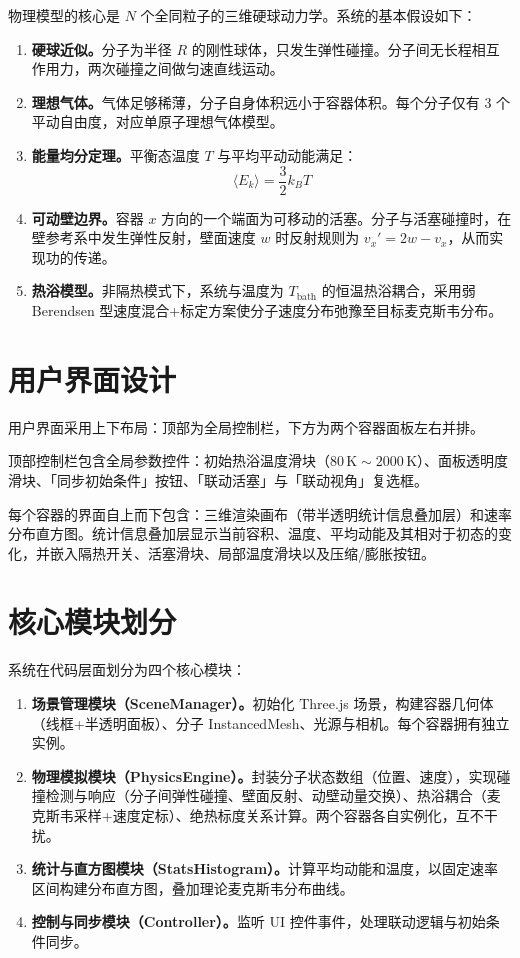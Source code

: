 \documentclass[zihao=-4,a4paper,oneside]{ctexbook}
\newcommand{\avg}[1]{\langle #1 \rangle}
\newcommand{\kb}{k_{\!B}}
\begin{document}
物理模型的核心是 $N$ 个全同粒子的三维硬球动力学。系统的基本假设如下：

\begin{enumerate}
  \item \textbf{硬球近似。}分子为半径 $R$ 的刚性球体，只发生弹性碰撞。分子间无长程相互作用力，两次碰撞之间做匀速直线运动。
  \item \textbf{理想气体。}气体足够稀薄，分子自身体积远小于容器体积。每个分子仅有 3 个平动自由度，对应单原子理想气体模型。
  \item \textbf{能量均分定理。}平衡态温度 $T$ 与平均平动动能满足：
  \begin{equation}
    \avg{E_k} = \frac{3}{2}\kb T
  \end{equation}
  \item \textbf{可动壁边界。}容器 $x$ 方向的一个端面为可移动的活塞。分子与活塞碰撞时，在壁参考系中发生弹性反射，壁面速度 $w$ 时反射规则为 $v_x'=2w-v_x$，从而实现功的传递。
  \item \textbf{热浴模型。}非隔热模式下，系统与温度为 $T_{\text{bath}}$ 的恒温热浴耦合，采用弱 Berendsen 型速度混合+标定方案使分子速度分布弛豫至目标麦克斯韦分布。
\end{enumerate}

\section{用户界面设计}

用户界面采用上下布局：顶部为全局控制栏，下方为两个容器面板左右并排。

顶部控制栏包含全局参数控件：初始热浴温度滑块（$80\,\text{K}\sim 2000\,\text{K}$）、面板透明度滑块、「同步初始条件」按钮、「联动活塞」与「联动视角」复选框。

每个容器的界面自上而下包含：三维渲染画布（带半透明统计信息叠加层）和速率分布直方图。统计信息叠加层显示当前容积、温度、平均动能及其相对于初态的变化，并嵌入隔热开关、活塞滑块、局部温度滑块以及压缩/膨胀按钮。

\section{核心模块划分}

系统在代码层面划分为四个核心模块：

\begin{enumerate}
  \item \textbf{场景管理模块（SceneManager）。}初始化 Three.js 场景，构建容器几何体（线框+半透明面板）、分子 InstancedMesh、光源与相机。每个容器拥有独立实例。
  \item \textbf{物理模拟模块（PhysicsEngine）。}封装分子状态数组（位置、速度），实现碰撞检测与响应（分子间弹性碰撞、壁面反射、动壁动量交换）、热浴耦合（麦克斯韦采样+速度定标）、绝热标度关系计算。两个容器各自实例化，互不干扰。
  \item \textbf{统计与直方图模块（StatsHistogram）。}计算平均动能和温度，以固定速率区间构建分布直方图，叠加理论麦克斯韦分布曲线。
  \item \textbf{控制与同步模块（Controller）。}监听 UI 控件事件，处理联动逻辑与初始条件同步。
\end{enumerate}
\end{document}
